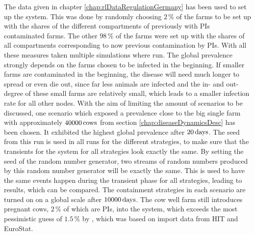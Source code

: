 The data given in chapter \ref {chap:rlDataRegulationGermany} has been used to set up the system. This was done by randomly choosing $2\,\%$ of the farms to be set up with the shares of the different compartments of previously with PIs contaminated farms. The other $98\,\%$ of the farms were set up with the shares of all compartments corresponding to now previous contamination by PIs. With all these measures taken multiple simulations where run. The global prevalence strongly depends on the farms chosen to be infected in the beginning. If smaller farms are contaminated in the beginning, the disease will need much longer to spread or even die out, since far less animals are infected and the in- and out-degree of these small farms are relatively small, which leads to a smaller infection rate for all other nodes. With the aim of limiting the amount of scenarios to be discussed, one scenario which exposed a prevalence close to the big single farm with approximately $40000\,\text{cows}$ from section \ref{chap:diseaseDynamicsDesc} has been chosen. It exhibited the highest global prevalence after $20\,\text{days}$. The seed from this run is used in all runs for the different strategies, to make sure that the transients for the system for all strategies look exactly the same. By setting the seed of the random number generator, two streams of random numbers produced by this random number generator will be exactly the same. This is used to have the same events happen during the transient phase for all strategies, leading to results, which can be compared. The containment strategies in each scenario are turned on on a global scale after $10000\,\text{days}$. 
The cow well farm still introduces pregnant cows, $2\,\%$ of which are PIs, into the system, which exceeds the most pessimistic guess of $1.5\,\%$ by \citep{personalCom}, which was based on import data from HIT and EuroStat.  
